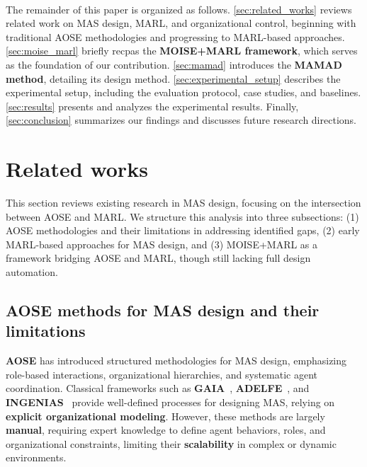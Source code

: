 \documentclass[pdflatex,sn-mathphys-num]{sn-jnl}%
\theoremstyle{thmstyleone}%
\theoremstyle{thmstyletwo}%
\theoremstyle{thmstylethree}%
\begin{document}
\

The remainder of this paper is organized as follows. \autoref{sec:related_works} reviews related work on MAS design, MARL, and organizational control, beginning with traditional AOSE methodologies and progressing to MARL-based approaches. \autoref{sec:moise_marl} briefly recpas the \textbf{MOISE+MARL framework}, which serves as the foundation of our contribution. \autoref{sec:mamad} introduces the \textbf{MAMAD method}, detailing its design method. \autoref{sec:experimental_setup} describes the experimental setup, including the evaluation protocol, case studies, and baselines. \autoref{sec:results} presents and analyzes the experimental results. Finally, \autoref{sec:conclusion} summarizes our findings and discusses future research directions.

\clearpage

\section{Related works}\label{sec:related_works}

This section reviews existing research in MAS design, focusing on the intersection between AOSE and MARL. We structure this analysis into three subsections: (1) AOSE methodologies and their limitations in addressing identified gaps, (2) early MARL-based approaches for MAS design, and (3) MOISE+MARL as a framework bridging AOSE and MARL, though still lacking full design automation.

\subsection{AOSE methods for MAS design and their limitations}

\textbf{AOSE} has introduced structured methodologies for MAS design, emphasizing role-based interactions, organizational hierarchies, and systematic agent coordination. Classical frameworks such as \textbf{GAIA}~\cite{gaia1998}, \textbf{ADELFE}~\cite{adelfe2002}, and \textbf{INGENIAS}~\cite{ingenias2004} provide well-defined processes for designing MAS, relying on \textbf{explicit organizational modeling}. However, these methods are largely \textbf{manual}, requiring expert knowledge to define agent behaviors, roles, and organizational constraints, limiting their \textbf{scalability} in complex or dynamic environments.
\end{document}
